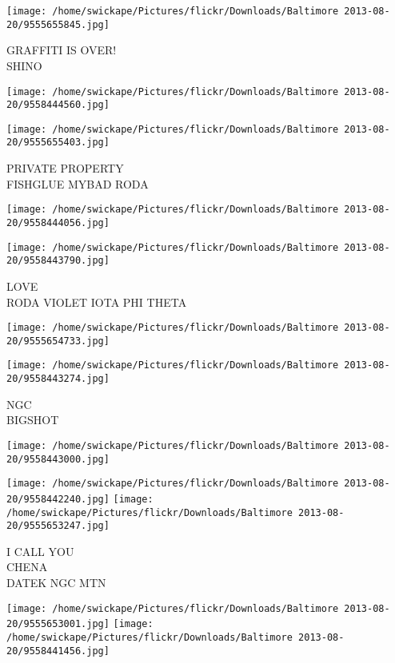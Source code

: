 \documentclass[10pt,letterpaper]{article}
\begin{document}
\vspace{0.25in}
\texttt{[image: /home/swickape/Pictures/flickr/Downloads/Baltimore 2013-08-20/9555655845.jpg]}

GRAFFITI IS OVER!\\
SHINO
\pagebreak

\texttt{[image: /home/swickape/Pictures/flickr/Downloads/Baltimore 2013-08-20/9558444560.jpg]}

\vspace{0.25in}
\texttt{[image: /home/swickape/Pictures/flickr/Downloads/Baltimore 2013-08-20/9555655403.jpg]}

PRIVATE PROPERTY\\
FISHGLUE MYBAD RODA
\pagebreak

\texttt{[image: /home/swickape/Pictures/flickr/Downloads/Baltimore 2013-08-20/9558444056.jpg]}

\vspace{0.25in}
\texttt{[image: /home/swickape/Pictures/flickr/Downloads/Baltimore 2013-08-20/9558443790.jpg]}

LOVE\\
RODA VIOLET IOTA PHI THETA
\pagebreak

\texttt{[image: /home/swickape/Pictures/flickr/Downloads/Baltimore 2013-08-20/9555654733.jpg]}

\vspace{0.25in}
\texttt{[image: /home/swickape/Pictures/flickr/Downloads/Baltimore 2013-08-20/9558443274.jpg]}

NGC\\
BIGSHOT
\pagebreak

\texttt{[image: /home/swickape/Pictures/flickr/Downloads/Baltimore 2013-08-20/9558443000.jpg]}

\vspace{0.25in}
\texttt{[image: /home/swickape/Pictures/flickr/Downloads/Baltimore 2013-08-20/9558442240.jpg]}
\texttt{[image: /home/swickape/Pictures/flickr/Downloads/Baltimore 2013-08-20/9555653247.jpg]}

I CALL YOU\\
CHENA\\
DATEK NGC MTN
\pagebreak

\texttt{[image: /home/swickape/Pictures/flickr/Downloads/Baltimore 2013-08-20/9555653001.jpg]}
\texttt{[image: /home/swickape/Pictures/flickr/Downloads/Baltimore 2013-08-20/9558441456.jpg]}
\end{document}
